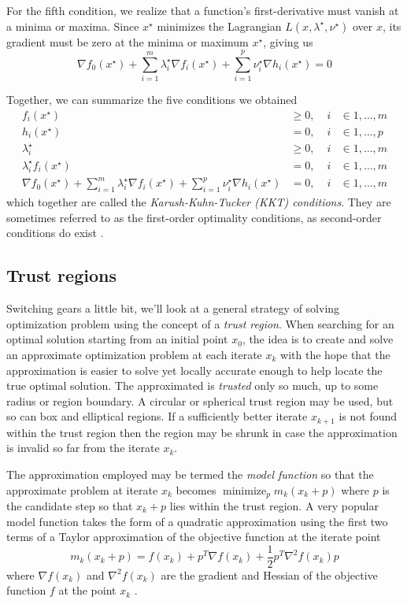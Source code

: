 For the fifth condition, we realize that a function's first-derivative must vanish at a minima or maxima. Since $x^\star$ minimizes the Lagrangian $L(x, \lambda^\star, \nu^\star)$ over $x$, its gradient must be zero at the minima or maximum $x^\star$, giving us
\begin{equation}
\nabla f_0(x^\star) + \sum_{i=1}^m \lambda_i^\star \nabla f_i(x^\star)
+ \sum_{i=1}^p \nu_i^\star \nabla h_i(x^\star) = 0
\end{equation}

Together, we can summarize the five conditions we obtained
\begin{align} \label{eq:kkt}
f_i(x^\star) & \geq 0, \; & i & \in {1,\dots,m} \nonumber \\
h_i(x^\star) & = 0, \; & i & \in {1,\dots,p} \nonumber \\
\lambda_i^\star & \geq 0, \; & i & \in {1,\dots,m} \\
\lambda_i^\star f_i(x^\star) & = 0, \; & i & \in {1,\dots,m} \nonumber \\
\nabla f_0(x^\star) + \sum_{i=1}^m \lambda_i^\star \nabla f_i(x^\star)
+ \sum_{i=1}^p \nu_i^\star \nabla h_i(x^\star) & = 0, \; & i & \in {1,\dots,m} \nonumber
\end{align}
which together are called the \emph{Karush-Kuhn-Tucker (KKT) conditions}. They are sometimes referred to as the first-order optimality conditions, as second-order conditions do exist \citep[\S 12.5]{Nocedal06}.

\subsection{Trust regions} \label{ssec:trust}
Switching gears a little bit, we'll look at a general strategy of solving optimization problem using the concept of a \emph{trust region}. When searching for an optimal solution starting from an initial point $x_0$, the idea is to create and solve an approximate optimization problem at each iterate $x_k$ with the hope that the approximation is easier to solve yet locally accurate enough to help locate the true optimal solution. The approximated is \emph{trusted} only so much, up to some radius or region boundary. A circular or spherical trust region may be used, but so can box and elliptical regions. If a sufficiently better iterate $x_{k+1}$ is not found within the trust region then the region may be shrunk in case the approximation is invalid so far from the iterate $x_k$.

The approximation employed may be termed the \emph{model function} so that the approximate problem at iterate $x_k$ becomes $\operatorname{minimize}_p m_k(x_k + p)$ where $p$ is the candidate step so that $x_k + p$ lies within the trust region. A very popular model function takes the form of a quadratic approximation using the first two terms of a Taylor approximation of the objective function at the iterate point
\begin{equation}
  m_k(x_k + p) = f(x_k) + p^T \nabla f(x_k) + \frac{1}{2} p^T \nabla^2 f(x_k) p
\end{equation}
where $\nabla f(x_k)$ and $\nabla^2 f(x_k)$ are the gradient and Hessian of the objective function $f$ at the point $x_k$ \citep{More83}.

